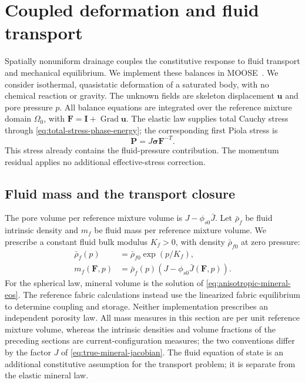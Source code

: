 \section{Coupled deformation and fluid transport}
\label{sec:finite-elements}

Spatially nonuniform drainage couples the constitutive response to fluid
transport and mechanical equilibrium. We implement these balances in
MOOSE~\cite{gaston2009moose}. We consider isothermal, quasistatic
deformation of a saturated body, with no chemical reaction or gravity.
The unknown fields are skeleton displacement \(\mathbf u\) and pore
pressure \(p\). All balance equations are integrated over the reference
mixture domain \(\Omega_0\), with
\(\mathbf F=\mathbf I+\operatorname{Grad}\mathbf u\).
The elastic law supplies total Cauchy stress through
\eqref{eq:total-stress-phase-energy}; the corresponding first Piola stress is
\begin{equation}
 \mathbf P=J\mathbf\sigma\mathbf F^{-T}.
 \label{eq:fe-total-first-piola}
\end{equation}
This stress already contains the fluid-pressure contribution. The momentum
residual applies no additional effective-stress correction.

\subsection{Fluid mass and the transport closure}
\label{sec:fe-fluid-closure}

The pore volume per reference mixture volume is
\(J-\phi_{s0}\bar J\). Let \(\bar\rho_f\) be fluid intrinsic density
and \(m_f\) be fluid mass per reference mixture volume. We prescribe a
constant fluid bulk modulus \(K_f>0\), with density \(\bar\rho_{f0}\)
at zero pressure:
\begin{align}
 \bar\rho_f(p)&=\bar\rho_{f0}\exp(p/K_f),
 \label{eq:fe-fluid-eos}\\
 m_f(\mathbf F,p)&=\bar\rho_f(p)
       \left(J-\phi_{s0}\bar J(\mathbf F,p)\right).
 \label{eq:fe-reference-fluid-mass}
\end{align}
For the spherical law, mineral volume is the solution of
\eqref{eq:anisotropic-mineral-eos}. The reference fabric calculations
instead use the linearized fabric equilibrium to determine coupling
and storage. Neither implementation prescribes an independent porosity law.
All mass measures in this section are per unit reference mixture volume,
whereas the intrinsic densities and volume fractions of the preceding sections
are current-configuration measures; the two conventions differ by the factor
\(J\) of \eqref{eq:true-mineral-jacobian}.
The fluid equation of state is an additional constitutive assumption for
the transport problem; it is separate from the elastic mineral law.

